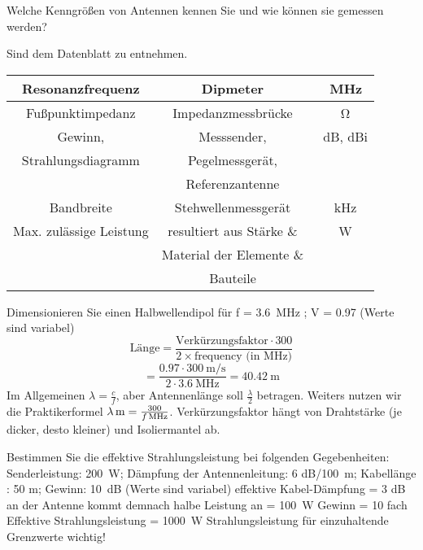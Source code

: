 \documentclass[avery5371,grid,frame,a4paper]{flashcards}
\newcommand{\card}[3]{
  \begin{flashcard}[{\chap} -- #1]{#2}#3\end{flashcard}
}
\begin{document}
\card{77}{Welche Kenngrößen von Antennen kennen Sie und wie können sie gemessen werden?}{
  \begin{center}
    Sind dem Datenblatt zu entnehmen.
  \end{center}

  \vspace{15pt}
  \scriptsize
  \begin{tabular}{ccc}
  \hline\hline
    Resonanzfrequenz             & Dipmeter                 & \SI{}{\mega\Hz} \\
  \hline
    Fußpunktimpedanz             & Impedanzmessbrücke       & \SI{}{\ohm} \\
  \hline
    Gewinn,                      & Messsender,              & \SI{}{\dB}, dBi \\
    Strahlungsdiagramm           & Pegelmessgerät,          & \\
                                 & Referenzantenne          & \\
  \hline
    Bandbreite                   & Stehwellenmessgerät      & \SI{}{\kHz} \\
  \hline
    Max. zulässige Leistung      & resultiert aus Stärke \& & \SI{}{\watt} \\
                                 & Material der Elemente \& & \\
                                 & Bauteile                 & \\
  \hline\hline
  \end{tabular}
}
\card{78}{Dimensionieren Sie einen Halbwellendipol für f = \SI{3.6}{\mega\Hz} ; V = 0.97 (Werte sind variabel)}{
  \[
    \text{Länge} 
      = \frac{\text{Verkürzungsfaktor}\cdot 300}{2 \times \text{frequency (in MHz)}}
  \] \[
      = \frac{0.97 \cdot \SI{300}{\metre\per\second}}{2 \cdot \SI{3.6}{\mega\Hz}} = \SI{40.42}{\metre}
  \]
  Im Allgemeinen $\lambda = \frac{c}{f}$, aber Antennenlänge soll $\frac\lambda2$ betragen. Weiters nutzen wir die Praktikerformel $\SI[math-rm = \mathnormal, parse-numbers = false]{\lambda}{\metre} = \frac{300}{\SI[math-rm = \mathnormal, parse-numbers = false]{f}{\mega\Hz}}$. Verkürzungsfaktor hängt von Drahtstärke (je dicker, desto kleiner) und Isoliermantel ab.
}
\card{79}{Bestimmen Sie die effektive Strahlungsleistung bei folgenden Gegebenheiten: Senderleistung: \SI{200}{\watt}; Dämpfung der Antennenleitung: 6 dB/\SI{100}{\metre}; Kabellänge : 50 m; Gewinn: \SI{10}{\dB} (Werte sind variabel)}{
  effektive Kabel-Dämpfung = 3 dB
an der Antenne kommt demnach halbe
Leistung an = \SI{100}{\watt}
Gewinn = 10 fach
Effektive Strahlungsleistung = \SI{1000}{\watt}
Strahlungsleistung für einzuhaltende 
Grenzwerte wichtig!
}
\end{document}
